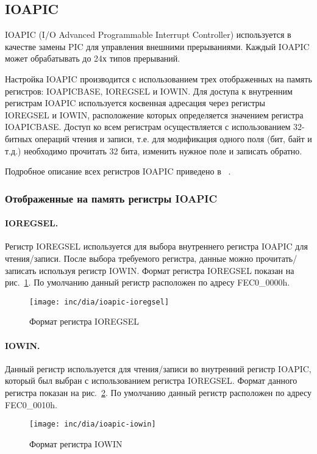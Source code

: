 \subsection{IOAPIC}
IOAPIC (I/O Advanced Programmable Interrupt Controller) используется в качестве замены PIC для
управления внешними прерываниями. Каждый IOAPIC может обрабатывать до 24х типов прерываний.

Настройка IOAPIC производится с использованием трех отображенных на память регистров:
IOAPICBASE, IOREGSEL и IOWIN. Для доступа к внутренним регистрам IOAPIC используется косвенная
адресация через регистры IOREGSEL и IOWIN, расположение которых определяется значением
регистра IOAPICBASE. Доступ ко всем регистрам осуществляется с использованием 32-битных
операций чтения и записи, т.е. для модификация одного поля (бит, байт и т.д.) необходимо
прочитать 32 бита, изменить нужное поле и записать обратно.

Подробное описание всех регистров IOAPIC приведено в ~\cite{ioapic}.

\subsubsection*{Отображенные на память регистры IOAPIC}
\paragraph{IOREGSEL.} Регистр IOREGSEL используется для выбора внутреннего регистра IOAPIC для чтения/записи.
После выбора требуемого регистра, данные можно прочитать/записать используя регистр IOWIN. Формат регистра
IOREGSEL показан на рис.~\ref{fig:ioapic-ioregsel}. По умолчанию данный регистр расположен по адресу FEC0\_0000h.
\begin{figure}[ht!]
  \centering
  \texttt{[image: inc/dia/ioapic-ioregsel]}
  \caption{Формат регистра IOREGSEL}
  \label{fig:ioapic-ioregsel}
\end{figure}

\paragraph{IOWIN.} Данный регистр используется для чтения/записи во внутренний регистр IOAPIC, который был
выбран с использованием регистра IOREGSEL. Формат данного регистра показан на рис.~\ref{fig:ioapic-iowin}.
По умолчанию данный регистр расположен по адресу FEC0\_0010h.
\begin{figure}[ht!]
  \centering
  \texttt{[image: inc/dia/ioapic-iowin]}
  \caption{Формат регистра IOWIN}
  \label{fig:ioapic-iowin}
\end{figure}

